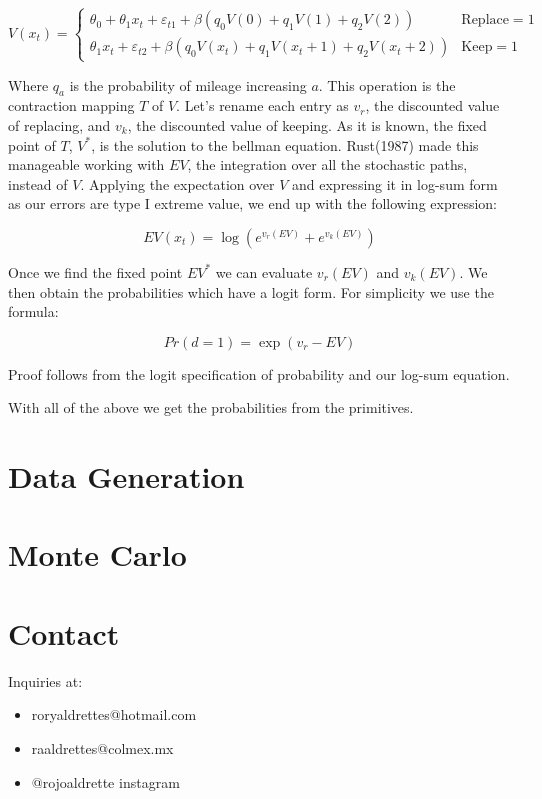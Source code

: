 \documentclass{article}
\begin{document}
$$V(x_t)=\begin{cases}
    \theta_0 +\theta_1 x_t+\varepsilon_{t1} +\beta (q_0 V(0)+q_1V(1)+q_2V(2)) & \text{Replace}=1 \\
    \theta_1 x_t+\varepsilon_{t2}+\beta (q_0 V(x_t)+q_1V(x_t+1)+q_2V(x_t+2)) & \text{Keep}=1
\end{cases}$$

Where $q_a$ is the probability of mileage increasing $a$. This operation is the contraction mapping $T$ of $V$. Let's rename each entry as $v_r$, the discounted value of replacing, and $v_k$, the discounted value of keeping. As it is known, the fixed point of $T$, $V^*$, is the solution to the bellman equation. Rust(1987) made this manageable working with $EV$, the integration over all the stochastic paths, instead of $V$. Applying the expectation over $V$ and expressing it in log-sum form as our errors are type I extreme value, we end up with the following expression:

$$EV(x_t)=\log(e^{v_r(EV)}+e^{v_k(EV)})$$

Once we find the fixed point $EV^*$ we can evaluate $v_r(EV)$ and $v_k(EV)$. We then obtain the probabilities which have a logit form. For simplicity we use the formula:

$$Pr(d=1)=\exp(v_r-EV)$$

Proof follows from the logit specification of probability and our log-sum equation.

With all of the above we get the probabilities from the primitives.


\section{Data Generation}




\section{Monte Carlo}



\section{Contact}
Inquiries at:
\begin{itemize}
    \item roryaldrettes@hotmail.com
    \item raaldrettes@colmex.mx
    \item @rojoaldrette instagram
\end{itemize}
\end{document}
